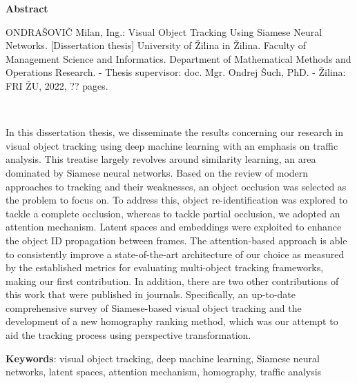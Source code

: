 \thispagestyle{empty}

\begin{center}
    \Large{\textbf{Abstract}}
\end{center}

\noindent ONDRAŠOVIČ Milan, Ing.: Visual Object Tracking Using Siamese Neural Networks.
    [Dissertation thesis] University of Žilina in Žilina. Faculty of Management Science and Informatics. Department of Mathematical Methods and Operations Research. - Thesis supervisor: doc. Mgr. Ondrej Šuch, PhD. - Žilina: FRI ŽU, 2022, ?? pages.

\


\noindent In this dissertation thesis, we disseminate the results concerning our research in visual object tracking using deep machine learning with an emphasis on traffic analysis. This treatise largely revolves around similarity learning, an area dominated by Siamese neural networks. Based on the review of modern approaches to tracking and their weaknesses, an object occlusion was selected as the problem to focus on. To address this, object re-identification was explored to tackle a complete occlusion, whereas to tackle partial occlusion, we adopted an attention mechanism. Latent spaces and embeddings were exploited to enhance the object ID propagation between frames. The attention-based approach is able to consistently improve a state-of-the-art architecture of our choice as measured by the established metrics for evaluating multi-object tracking frameworks, making our first contribution. In addition, there are two other contributions of this work that were published in journals. Specifically, an up-to-date comprehensive survey of Siamese-based visual object tracking and the development of a new homography ranking method, which was our attempt to aid the tracking process using perspective transformation.

\noindent \textbf{Keywords}: visual object tracking, deep machine learning, Siamese neural networks, latent spaces, attention mechanism, homography, traffic analysis
